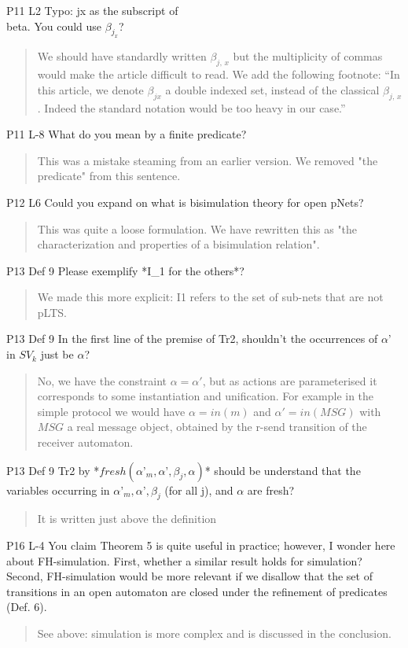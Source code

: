 \documentclass{article}
\begin{document}
P11 L2 Typo: jx as the subscript of \\beta. You could use $\beta_{j_x}$?
\begin{quote}
We should have standardly written $\beta_{j,\, x}$ but the multiplicity of commas would make the article difficult to read. We add the following footnote:
``In this article, we denote $\beta_{j x}$  a double indexed set, instead of the classical $\beta_{j,\, x}$. Indeed the standard notation would be too heavy in our case.''
\end{quote}

P11 L-8 What do you mean by a finite predicate?
\begin{quote}
This was a mistake steaming from an earlier version. We removed "the predicate" from this sentence.
\end{quote}

P12 L6 Could you expand on what is bisimulation theory for open pNets?
\begin{quote}
This was quite a loose formulation. We have rewritten this as "the characterization and properties of a bisimulation relation".
\end{quote}

P13 Def 9 Please exemplify *I\_1 for the others*?
\begin{quote}
We made this more explicit: I1 refers to the set of sub-nets that are not pLTS.
\end{quote}

P13 Def 9 In the first line of the premise of Tr2, shouldn’t the occurrences of $\alpha’$ in $SV_k$ just be $\alpha$?
\begin{quote}

No, we have the constraint $\alpha=\alpha'$, but as actions are parameterised it corresponds to some instantiation and unification. For example in the simple protocol we would have $\alpha=in(m)$ and $\alpha'= in(MSG)$ with $MSG$ a real message object, obtained by the r-send transition of the receiver automaton.
\end{quote}


P13 Def 9 Tr2 by *$fresh(\alpha’_m,\alpha’,\beta_j,\alpha)$* should be understand that the variables occurring in $\alpha’_m,\alpha’, \beta_j$ (for all j), and $\alpha$ are fresh?
\begin{quote}
It is written just above the definition
\end{quote}

P16 L-4 You claim Theorem 5 is quite useful in practice; however, I wonder here about FH-simulation. First, whether a similar result holds for simulation? Second, FH-simulation would be more relevant if we 
disallow that the set of transitions in an open automaton are closed under the refinement of predicates (Def. 6).
\begin{quote}
See above: simulation is more complex and is discussed in the conclusion.
\end{quote}
\end{document}
